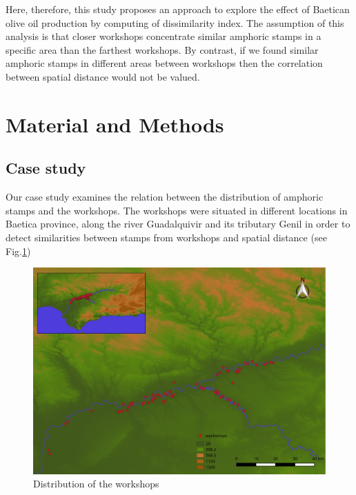 \documentclass[review]{elsarticle}
\begin{document}
Here, therefore, this study proposes an approach to explore the effect of Baetican olive oil production by computing of dissimilarity index. The assumption of this analysis is that closer workshops concentrate similar amphoric stamps in a specific area than the farthest workshops. By contrast, if we found similar amphoric stamps in different areas between workshops then the correlation between spatial distance would not be valued.  





\section{Material and Methods}

\subsection{Case study}

Our case study examines the relation between the distribution of amphoric stamps and the workshops. The workshops were situated in different locations in Baetica province, along the river Guadalquivir and its tributary Genil in order to detect similarities between stamps from workshops and spatial distance (see Fig.\ref{workshop})


\begin{figure}[htp]
	\centering
\includegraphics[width=\linewidth]{figs/workshop}
\caption{Distribution of the workshops}
\label{workshop}
\end{figure} 
\end{document}
